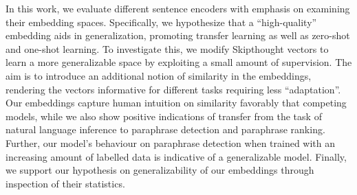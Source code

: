 In this work, we evaluate different sentence encoders with emphasis on examining their embedding spaces. Specifically, we hypothesize that a ``high-quality'' embedding aids in generalization, promoting transfer learning as well as zero-shot and one-shot learning. To investigate this, we modify Skipthought vectors to learn a more generalizable space by exploiting a small amount of supervision. The aim is to introduce an additional notion of similarity in the embeddings, rendering the vectors informative for different tasks requiring less ``adaptation''. Our embeddings capture human intuition on similarity favorably that competing models, while we also show positive indications of transfer from the task of natural language inference to paraphrase detection and paraphrase ranking. Further, our model's behaviour on paraphrase detection when trained with an increasing amount of labelled data is indicative of a generalizable model. Finally, we support our hypothesis on generalizability of our embeddings through inspection of their statistics.
